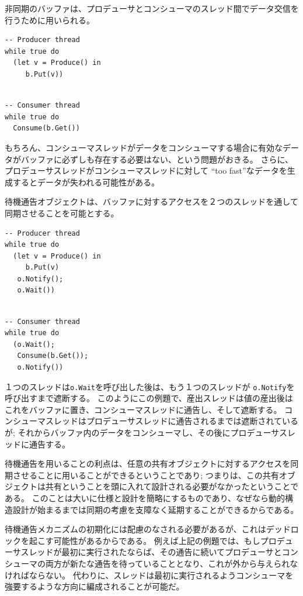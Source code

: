 \documentclass[\pformat,12pt]{jreport}
\begin{document}
非同期のバッファは、プロデューサとコンシューマのスレッド間でデータ交信を行うために用いられる。

\begin{multicols}{2}
\begin{lstlisting}
-- Producer thread
while true do
  (let v = Produce() in
     b.Put(v))
\end{lstlisting}
\begin{lstlisting}

-- Consumer thread
while true do
  Consume(b.Get())
\end{lstlisting}
\end{multicols}

もちろん、コンシューマスレッドがデータをコンシューマする場合に有効なデータがバッファに必ずしも存在する必要はない、という問題がおきる。
さらに、プロデューサスレッドがコンシューマスレッドに対して ``too fast''なデータを生成するとデータが失われる可能性がある。

待機通告オブジェクトは、バッファに対するアクセスを２つのスレッドを通して同期させることを可能とする。

\begin{multicols}{2}
\begin{lstlisting}
-- Producer thread
while true do
  (let v = Produce() in
     b.Put(v)
   o.Notify();
   o.Wait())
\end{lstlisting}
\begin{lstlisting}

-- Consumer thread
while true do
  (o.Wait();
   Consume(b.Get());
   o.Notify())
\end{lstlisting}
\end{multicols}

１つのスレッドは\texttt{o.Wait}を呼び出した後は、もう１つのスレッドが \texttt{o.Notify}を呼び出すまで遮断する。
このようにこの例題で、産出スレッドは値の産出後はこれをバッファに置き、コンシューマスレッドに通告し、そして遮断する。
コンシューマスレッドはプロデューサスレッドに通告されるまでは遮断されているが; それからバッファ内のデータをコンシューマし、その後にプロデューサスレッドに通告する。

待機通告を用いることの利点は、任意の共有オブジェクトに対するアクセスを同期させることに用いることができるということであり; つまりは、この共有オブジェクトは共有ということを頭に入れて設計される必要がなかったということである。
このことは大いに仕様と設計を簡略にするものであり、なぜなら動的構造設計が始まるまでは同期の考慮を支障なく延期することができるからである。

待機通告メカニズムの初期化には配慮のなされる必要があるが、これはデッドロックを起こす可能性があるからである。
例えば上記の例題では、もしプロデューサスレッドが最初に実行されたならば、その通告に続いてプロデューサとコンシューマの両方が新たな通告を待っていることとなり、これが外から与えられなければならない。
代わりに、スレッドは最初に実行されるようコンシューマを強要するような方向に編成されることが可能だ。
\end{document}
